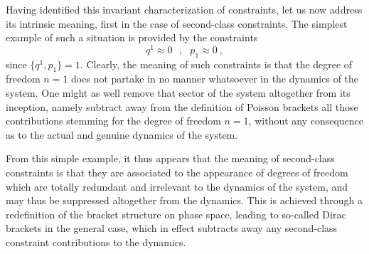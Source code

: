 \documentclass[a4paper,11pt]{article}
\begin{document}
Having identified this invariant characterization of constraints,
let us now address its intrinsic meaning, first in the case
of second-class constraints. The simplest example of such a situation
is provided by the constraints
\begin{equation}
q^1\approx 0\ \ \ ,\ \ \ p_1\approx 0\ ,
\end{equation}
since $\{q^1,p_1\}=1$. Clearly, the meaning of such constraints is that
the degree of freedom $n=1$ does not partake in no manner whatsoever
in the dynamics of the system. One might as well remove that sector of
the system altogether from its inception, namely subtract away from the
definition of Poisson bra\-ckets all those contributions stemming for the
degree of freedom $n=1$, without any consequence as to the actual and genuine
dynamics of the system.

From this simple example, it thus appears that the meaning of second-class
constraints is that they are associated to the appearance of degrees of
freedom which are totally redundant and irrelevant to the dynamics of the
system, and may thus be suppressed altogether from the dynamics. This is
achieved through a redefinition of the bracket structure on phase space,
leading to so-called Dirac brackets in the general case, which in effect
subtracts away any second-class constraint contributions to the dynamics.
\end{document}
